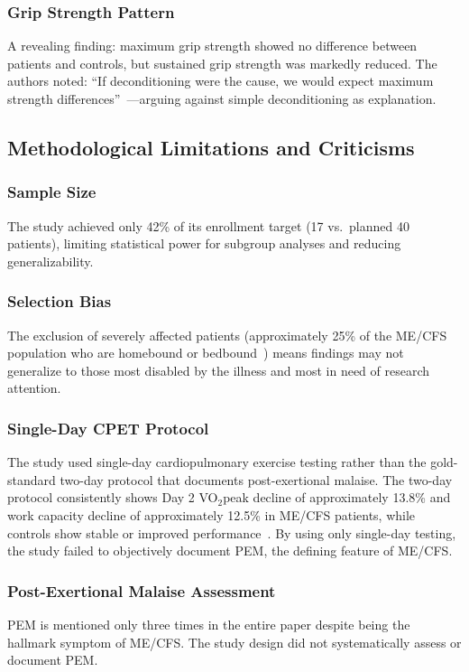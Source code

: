 \subsubsection{Grip Strength Pattern}
A revealing finding: maximum grip strength showed no difference between patients and controls, but sustained grip strength was markedly reduced. The authors noted: ``If deconditioning were the cause, we would expect maximum strength differences''~\cite{walitt2024deep}---arguing against simple deconditioning as explanation.

\subsection{Methodological Limitations and Criticisms}

\subsubsection{Sample Size}
The study achieved only 42\% of its enrollment target (17 vs.\ planned 40 patients), limiting statistical power for subgroup analyses and reducing generalizability.

\subsubsection{Selection Bias}
The exclusion of severely affected patients (approximately 25\% of the ME/CFS population who are homebound or bedbound~\cite{Pendergrast2020housebound}) means findings may not generalize to those most disabled by the illness and most in need of research attention.

\subsubsection{Single-Day CPET Protocol}
The study used single-day cardiopulmonary exercise testing rather than the gold-standard two-day protocol that documents post-exertional malaise. The two-day protocol consistently shows Day 2 VO$_2$peak decline of approximately 13.8\% and work capacity decline of approximately 12.5\% in ME/CFS patients, while controls show stable or improved performance~\cite{keller2024cpet}. By using only single-day testing, the study failed to objectively document PEM, the defining feature of ME/CFS.

\subsubsection{Post-Exertional Malaise Assessment}
PEM is mentioned only three times in the entire paper despite being the hallmark symptom of ME/CFS. The study design did not systematically assess or document PEM.


